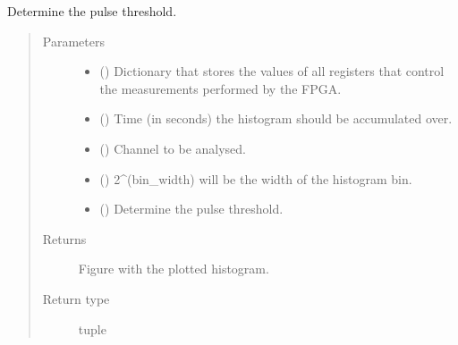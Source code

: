 \documentclass[letterpaper,10pt,english]{sphinxmanual}
\begin{document}

\begin{fulllineitems}
\label{\detokenize{tes:tes.mca_control.pulse_threshold}}
\sphinxAtStartPar
Determine the pulse threshold.
\begin{quote}\begin{description}
\item[{Parameters}] \leavevmode\begin{itemize}
\item {} 
\sphinxAtStartPar
{} () \textendash{} Dictionary that stores the values of all registers that control
the measurements performed by the FPGA.

\item {} 
\sphinxAtStartPar
{} () \textendash{} Time (in seconds) the histogram should be accumulated over.

\item {} 
\sphinxAtStartPar
{} () \textendash{} Channel to be analysed.

\item {} 
\sphinxAtStartPar
{} () \textendash{} 2\textasciicircum{}(bin\_width) will be the width of the histogram bin.

\item {} 
\sphinxAtStartPar
{} () \textendash{} Determine the pulse threshold.

\end{itemize}

\item[{Returns}] \leavevmode
\sphinxAtStartPar
{} \textendash{} Figure with the plotted histogram.

\item[{Return type}] \leavevmode
\sphinxAtStartPar
tuple

\end{description}\end{quote}

\end{fulllineitems}
\end{document}
